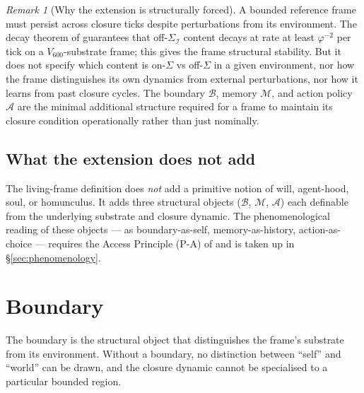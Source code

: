 \documentclass[11pt]{article}
\theoremstyle{plain}
\theoremstyle{definition}
\theoremstyle{remark}
\newtheorem{remark}[theorem]{Remark}
\newcommand{\Ical}{\mathcal{I}}
\newcommand{\Mcal}{\mathcal{M}}
\newcommand{\Acal}{\mathcal{A}}
\newcommand{\Bcal}{\mathcal{B}}
\begin{document}
\begin{remark}[Why the extension is structurally forced]\label{rem:why-extension}
A bounded reference frame must persist across closure ticks despite perturbations from its environment. The decay theorem of \citet{SmartExistenceClosure} guarantees that off-$\Sigma_\Ical$ content decays at rate at least $\varphi^{-2}$ per tick on a $V_{600}$-substrate frame; this gives the frame structural stability. But it does not specify which content is on-$\Sigma$ vs off-$\Sigma$ in a given environment, nor how the frame distinguishes its own dynamics from external perturbations, nor how it learns from past closure cycles. The boundary $\Bcal$, memory $\Mcal$, and action policy $\Acal$ are the minimal additional structure required for a frame to maintain its closure condition operationally rather than just nominally.
\end{remark}

\subsection{What the extension does not add}

The living-frame definition does \emph{not} add a primitive notion of will, agent-hood, soul, or homunculus. It adds three structural objects ($\Bcal$, $\Mcal$, $\Acal$) each definable from the underlying substrate and closure dynamic. The phenomenological reading of these objects --- as boundary-as-self, memory-as-history, action-as-choice --- requires the Access Principle (P-A) of \citet{SmartExistenceClosure} and is taken up in \S\ref{sec:phenomenology}.

\section{Boundary}\label{sec:boundary}

The boundary is the structural object that distinguishes the frame's substrate from its environment. Without a boundary, no distinction between ``self'' and ``world'' can be drawn, and the closure dynamic cannot be specialised to a particular bounded region.
\end{document}
